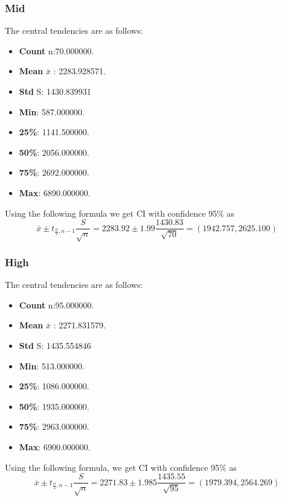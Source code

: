\documentclass{beamer}
\begin{document}
\begin{frame}
\frametitle{Mid}
The central tendencies are as follows:
    \begin{block}{}
        \begin{itemize}
            \item \textbf{Count} n:70.000000.
            \item \textbf{Mean} $\bar{x}$ : 2283.928571.
            \item \textbf{Std} S: 1430.839931
            \item \textbf{Min}: 587.000000.
            \item \textbf{25\%}: 1141.500000.
            \item \textbf{50\%}: 2056.000000.
            \item \textbf{75\%}: 2692.000000.
            \item \textbf{Max}: 6890.000000.
        \end{itemize}
    \end{block}
    Using the following formula we get CI with confidence 95\% as
        \begin{equation}
        \bar{x} \pm t_{\frac{\alpha}{2}, n-1} \frac{S}{\sqrt{n}} =
        2283.92 \pm 1.99 \frac{1430.83}{\sqrt{70}} = (1942.757,2625.100)
        \end{equation}
\end{frame}

\begin{frame}
\frametitle{High}
The central tendencies are as follows:
    \begin{block}{}
        \begin{itemize}
            \item \textbf{Count} n:95.000000.
            \item \textbf{Mean} $\bar{x}$ : 2271.831579.
            \item \textbf{Std} S: 1435.554846
            \item \textbf{Min}: 513.000000.
            \item \textbf{25\%}: 1086.000000.
            \item \textbf{50\%}: 1935.000000.
            \item \textbf{75\%}: 2963.000000.
            \item \textbf{Max}: 6900.000000.
        \end{itemize}
    \end{block}
    Using the following formula, we get CI with confidence 95\% as
        \begin{equation}
        \bar{x} \pm t_{\frac{\alpha}{2}, n-1} \frac{S}{\sqrt{n}} =
        2271.83 \pm 1.985 \frac{1435.55}{\sqrt{95}}  = (1979.394,2564.269)
        \end{equation}
\end{frame}
\end{document}
